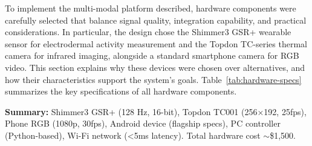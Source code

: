 \documentclass{report}
\begin{document}
    To implement the multi-modal platform described, hardware components were carefully selected that balance signal quality, integration capability, and practical considerations. In particular, the design chose the Shimmer3 GSR+ wearable sensor for electrodermal activity measurement and the Topdon TC-series thermal camera for infrared imaging, alongside a standard smartphone camera for RGB video. This section explains why these devices were chosen over alternatives, and how their characteristics support the system's goals. Table~\ref{tab:hardware-specs} summarizes the key specifications of all hardware components.

\begin{table}[htbp]
    \centering
    \small
    \caption{Summary of Hardware Components and Specifications}
    \label{tab:hardware-specs}
    
    \vspace{0.3cm}
    \textbf{Summary:} Shimmer3 GSR+ (128 Hz, 16-bit), Topdon TC001 (256×192, 25fps), Phone RGB (1080p, 30fps), Android device (flagship specs), PC controller (Python-based), Wi-Fi network (<5ms latency). Total hardware cost $\sim$\$1,500.
\end{table}
\end{document}
